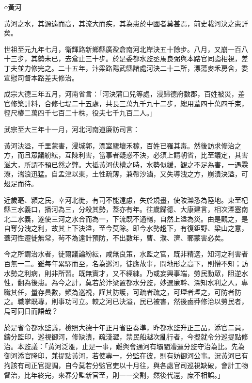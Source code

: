 
\begin{pinyinscope}

 ○黃河



 黃河之水，其源遠而高，其流大而疾，其為患於中國者莫甚焉，前史載河決之患詳矣。



 世祖至元九年七月，衛輝路新鄉縣廣盈倉南河北岸決五十餘步。八月，又崩一百八十三步，其勢未已，去倉止三十步。於是委都水監丞馬良弼與本路官同詣相視，差丁夫並力修完之。二十五年，汴梁路陽武縣諸處河決二十二所，漂蕩麥禾房舍，委宣慰司督本路差夫修治。



 成宗大德三年五月，河南省言：「河決蒲口兒等處，浸歸德府數郡，百姓被災，差官修築計料，合修七堤二十五處，共長三萬九千九十二步，總用葦四十萬四千束，徑尺樁二萬四千七百二十株，役夫七千九百二人。」



 武宗至大三年十一月，河北河南道廉訪司言：



 黃河決溢，千里蒙害，浸城郭，漂室廬壞禾稼，百姓已罹其毒。然後訪求修治之方，而且眾議紛紜，互陳利害，當事者疑惑不決，必須上請朝省，比至議定，其害滋大，所謂不預已然之弊。大抵黃河伏槽之時，水勢似緩，觀之不足為害，一遇霖潦，湍浪迅猛。自孟津以東，土性疏薄，兼帶沙滷，又失導洩之方，崩潰決溢，可翅足而待。



 近歲亳、潁之民，幸河北徙，有司不能遠慮，失於規畫，使陂濼悉為陸地。東至杞縣三水義口，播河為三，分殺其勢，蓋亦有年。往歲歸德、大康建言，相次湮塞南北二水義，遂使三河之水合而為一，下流既不通暢，自然上溢為災。由是觀之，是自奪分洩之利，故其上下決溢，至今莫除。即今水勢趨下，有復鉅野、梁山之意，蓋河性遷徙無常，茍不為遠計預防，不出數年，曹、濮、濟、鄆蒙害必矣。



 今之所謂治水者，徒爾議論紛紜，咸無良策，水監之官，既非精選，知河之利害者百無一二。雖每年累驛而至，名為巡河，徒應故事，問地形之高下，則懵不知；訪水勢之利病，則非所習。既無實才，又不經練。乃或妄興事端，勞民動眾，阻逆水性，翻為後患。為今之計，莫若於汴梁置都水分監，妙選廉幹、深知水利之人，專職其任，量存員數，頻為巡視，謹其防護，可疏者疏之，可堙者堙之，可防者防之。職掌既專，則事功可立。較之河已決溢，民已被害，然後鹵莽修治以勞民者，烏可同日而語哉？



 於是省令都水監議，檢照大德十年正月省臣奏準，昨都水監升正三品，添官二員，鑄分監印，巡視御河，修缺潰，疏淺澀，禁民船越次亂行者，今擬就令分巡提點修治。本監議：「黃河泛漲，止是一事，難與會通河有壩闡漕運分監守治為比。先為御河添官降印，兼提點黃河，若使專一，分監在彼，則有妨御河公事。況黃河已有拘該有司正官提調，自今莫若分監官吏以十月往，與各處官司巡視缺破，會計工物督治，比年終完，來春分監新官至，則一一交割，然後代還，庶不相誤。」




\end{pinyinscope}
